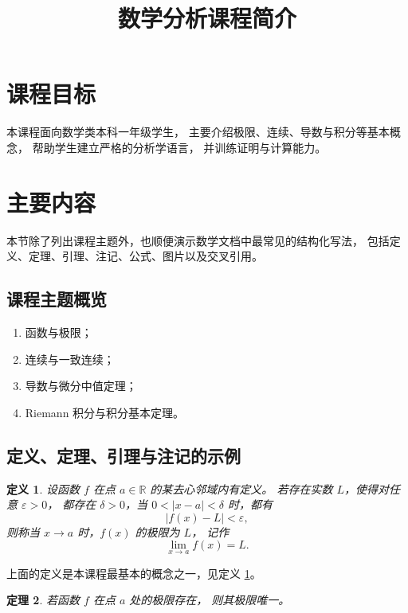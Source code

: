 \documentclass[UTF8]{ctexart}
\title{数学分析课程简介}
\date{}
\newtheorem{theorem}{定理}[section]
\newtheorem{definition}[theorem]{定义}
\numberwithin{equation}{section}
\newcommand{\RR}{\mathbb{R}}
\begin{document}
\maketitle

\section{课程目标}

本课程面向数学类本科一年级学生，
主要介绍极限、连续、导数与积分等基本概念，
帮助学生建立严格的分析学语言，
并训练证明与计算能力。

\section{主要内容}

本节除了列出课程主题外，也顺便演示数学文档中最常见的结构化写法，
包括定义、定理、引理、注记、公式、图片以及交叉引用。

\subsection{课程主题概览}

\begin{enumerate}
  \item 函数与极限；
  \item 连续与一致连续；
  \item 导数与微分中值定理；
  \item Riemann 积分与积分基本定理。
\end{enumerate}

\subsection{定义、定理、引理与注记的示例}

\begin{definition}\label{def:limit}
设函数 $f$ 在点 $a \in \RR$ 的某去心邻域内有定义。
若存在实数 $L$，使得对任意 $\varepsilon>0$，
都存在 $\delta>0$，当 $0<|x-a|<\delta$ 时，都有
\[
|f(x)-L|<\varepsilon,
\]
则称当 $x\to a$ 时，$f(x)$ 的极限为 $L$，
记作
\[
\lim_{x\to a} f(x)=L.
\]
\end{definition}

上面的定义是本课程最基本的概念之一，见定义 \ref{def:limit}。

\begin{theorem}\label{thm:unique-limit}
若函数 $f$ 在点 $a$ 处的极限存在，
则其极限唯一。
\end{theorem}
\end{document}
